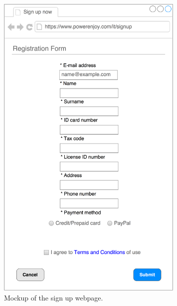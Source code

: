 \begin{figure}[H]
\begin{center}
		\includegraphics[width=0.8\textwidth]{./specific_requirements/features/diagrams/web_registration.png}
		\caption{Mockup of the sign up webpage.}
\end{center}
\end{figure}